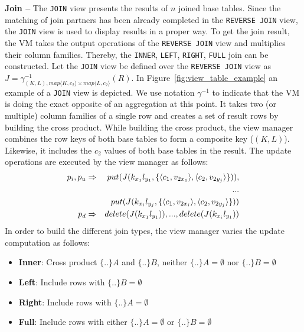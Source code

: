 \noindent
\textbf{Join --} The \texttt{JOIN} view presents the results of $n$ 
joined base tables. Since the matching of join partners has been already 
completed in the \texttt{REVERSE JOIN} view, the \texttt{JOIN} view is 
used to display results in a proper way. To get the join result, the VM 
takes the output operations of the \texttt{REVERSE JOIN} view and 
multiplies their column families. Thereby, the \texttt{INNER}, 
\texttt{LEFT}, \texttt{RIGHT}, \texttt{FULL} join can be constructed. 
Let the \texttt{JOIN} view be defined over the \texttt{REVERSE JOIN} 
view as $J=\gamma^{-1}_{(K,L), map\langle K,c_2\rangle \times 
map\langle L,c_2\rangle}(R)$. In Figure~\ref{fig:view_table_example} an example 
of a \texttt{JOIN} view is depicted. We use notation $\gamma^{-1}$ to 
indicate that the VM is doing the exact opposite of an aggregation at 
this point. It takes two (or multiple) column families of a single row 
and creates a set of result rows by building the cross product. While 
building the cross product, the view manager combines the row keys of 
both base tables to form a composite key ($(K,L)$). Likewise, it includes the 
$c_2$ values of both base tables in the result. The update operations 
are executed by the view manager as follows: 
%
\begin{eqnarray}
		p_i,p_u& \Rightarrow& put(J(k_{x_1}l_{y_1},\{\langle c_1, v_{2x_1} \rangle,\langle c_2, v_{2y_j} \rangle\})),\\
		 	&&...\notag\\
		 	&&put(J(k_{x_i}l_{y_j},\{\langle c_1, v_{2x_i} \rangle,\langle c_2, v_{2y_j} \rangle\}))\\	
		p_d& \Rightarrow& delete(J(k_{x_1}l_{y_1})),...,delete(J(k_{x_i}l_{y_1}))	 	 	
\end{eqnarray}
%
\noindent 
In order to build the different join types, the view manager varies
the update computation as follows:
{\renewcommand\labelitemi{}
\begin{itemize}
\setlength{\itemindent}{-.05in}
\item \textbf{Inner}: Cross product $\{..\}A$ and
  $\{..\}B$, neither $\{..\}A=\emptyset$ nor $\{..\}B=\emptyset$
\item \textbf{Left}: Include rows with $\{..\}B=\emptyset$
\item \textbf{Right}: Include rows with $\{..\}A=\emptyset$
\item \textbf{Full}: Include rows with either
  $\{..\}A=\emptyset$ or $\{..\}B=\emptyset$
\end{itemize}
}



